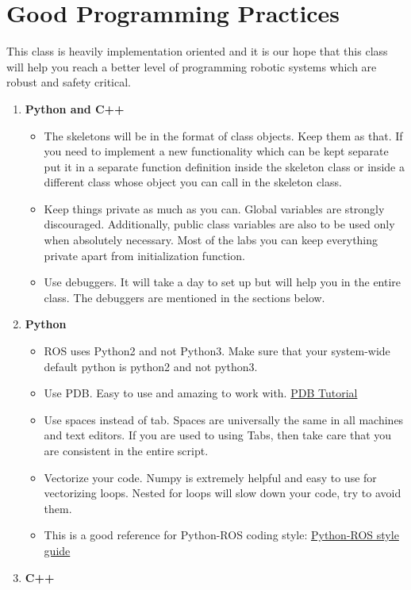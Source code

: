 \documentclass[letta4 paper]{article}
\numberwithin{equation}{section}
\newcommand{\0}{\mathbf{0}}
\begin{document}
	\section{Good Programming Practices}
	This class is heavily implementation oriented and it is our hope that this class will help you reach a better level of programming robotic systems which are robust and safety critical. 
	\begin{enumerate}
	\item \textbf{Python and C++}
	\begin{itemize}
		\item The skeletons will be in the format of class objects. Keep them as that. If you need to implement a new functionality which can be kept separate put it in a separate function definition inside the skeleton class or inside a different class whose object you can call in the skeleton class. 
		\item Keep things private as much as you can. Global variables are strongly discouraged. Additionally, public class variables are also to be used only when absolutely necessary. Most of the labs you can keep everything private apart from initialization function.
		\item Use debuggers. It will take a day to set up but will help you in the entire class. The debuggers are mentioned in the sections below.
	\end{itemize}
	\item \textbf{Python}
	\begin{itemize}
		\item ROS uses Python2 and not Python3. Make sure that your system-wide default python is python2 and not python3. 
		\item Use PDB. Easy to use and amazing to work with. \href{https://realpython.com/python-debugging-pdb/}{PDB Tutorial}
		\item Use spaces instead of tab. Spaces are universally the same in all machines and text editors. If you are used to using Tabs, then take care that you are consistent in the entire script. 
		\item Vectorize your code. Numpy is extremely helpful and easy to use for vectorizing loops. Nested for loops will slow down your code, try to avoid them.
		\item This is a good reference for Python-ROS coding style:
		\href{http://wiki.ros.org/PyStyleGuide}{Python-ROS style guide}
	\end{itemize}{}
	\item \textbf{C++}

\end{enumerate}
\end{document}
